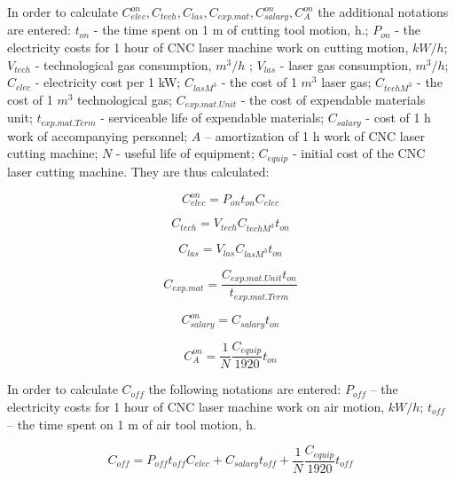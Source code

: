\documentclass[runningheads]{llncs}
\begin{document}
In order to calculate
$C^{on}_{elec}, C_{tech}, C_{las}, C_{exp.mat}, C^{on}_{salary}, C^{on}_A$
the additional notations are entered:
$t_{on}$  - the time spent on 1 m of cutting tool motion, h.;
$P_{on}$  - the electricity costs for 1 hour of CNC laser machine work on cutting motion, $kW/h$;
$V_{tech}$  - technological gas consumption, $m^3/h$ ;
$V_{las}$ - laser gas consumption, $m^3/h$;
$C_{elec}$  - electricity cost per 1 kW;
$C_{las M^3}$  - the cost of 1 $m^3$ laser gas;
$C_{tech M^3}$  - the cost of 1 $m^3$ technological gas;
$C_{exp.mat.Unit}$  - the cost of expendable materials unit;
$t_{exp.mat.Term}$  - serviceable life of expendable materials;
$C_{salary}$ - cost of 1 h work of accompanying personnel;
$A$ – amortization of 1 h work of CNC laser cutting machine;
$N$ - useful life of equipment;
$C_{equip}$  - initial cost of the CNC laser cutting machine.
They are thus calculated:

\begin{equation}
\label{eq1.4}
C^{on}_{elec} = P_{on} t_{on} C_{elec}
\end{equation}

\begin{equation}
  \label{eq1.5}
  C_{tech} = V_{tech} C_{tech M^3} t_{on}
\end{equation}

\begin{equation}
  \label{eq1.6}
  C_{las} = V_{las} C_{las M^3} t_{on}
\end{equation}

\begin{equation}
  \label{eq1.7}
  C_{exp.mat} = \frac{C_{exp.mat.Unit} t_{on}}{t_{exp.mat.Term}}
\end{equation}

\begin{equation}
  \label{eq1.8}
  C^{on}_{salary} = C_{salary} t_{on}
\end{equation}

\begin{equation}
  \label{eq1.9}
  C^{on}_A = \frac{1}N \frac{C_{equip}}{1920} t_{on}
\end{equation}

In order to calculate $C_{off}$
the following notations are entered:
$P_{off}$ – the electricity costs for 1 hour of CNC laser machine work on air motion, $kW/h$;
$t_{off}$ – the time spent on 1 m of air tool motion, h.

\begin{equation}
  \label{eq1.10}
  C_{off}
  = P_{off} t_{off} C_{elec}
  + C_{salary} t_{off}
  + \frac{1}N \frac{C_{equip}}{1920} t_{off}
\end{equation}
\end{document}
